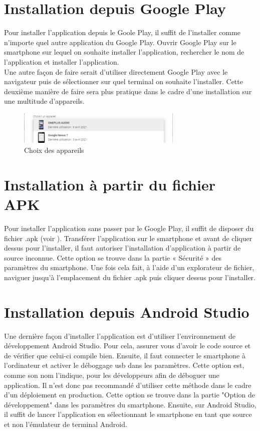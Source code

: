 \documentclass[UTF8]{EPURapport}
\begin{document}
\section{Installation depuis Google Play}
Pour installer l'application depuis le Goole Play, il suffit de l'installer comme n'importe quel autre application du Google Play. Ouvrir Google Play sur le smartphone sur lequel on souhaite installer l'application, rechercher le nom de l'application et installer l'application. \\
Une autre façon de faire serait d'utiliser directement Google Play avec le navigateur puis de sélectionner sur quel terminal on souhaite l'installer. Cette deuxième manière de faire sera plus pratique dans le cadre d'une installation sur une multitude d'appareils. \\
\begin{figure}[h!]
\centering
  \includegraphics[width=0.7\textwidth]{images/DeviceChoice.JPG}
  \caption{Choix des appareils}
  \label{fig:devicechoice}
\end{figure}
\section{Installation à partir du fichier APK}
Pour installer l'application sans passer par le Google Play, il suffit de disposer du fichier .apk (voir  ). Transférer l'application sur le smartphone et avant de cliquer dessus pour l'installer, il faut autoriser l'installation d'application à partir de source inconnue. Cette option se trouve dans la partie « Sécurité » des paramètres du smartphone. Une fois cela fait, à l'aide d'un explorateur de fichier, naviguer jusqu'à l'emplacement du fichier .apk puis cliquer dessus pour l'installer.

\section{Installation depuis Android Studio}
Une dernière façon d'installer l'application est d'utiliser l'environnement de développement Android Studio. Pour cela, assurer vous d'avoir le code source et de vérifier que celui-ci compile bien. Ensuite, il faut connecter le smartphone à l'ordinateur et activer le déboggage usb dans les paramètres. Cette option est, comme son nom l’indique, pour les développeurs afin de déboguer une application. Il n'est donc pas recommandé d'utiliser cette méthode dans le cadre d'un déploiement en production. Cette option se trouve dans la partie "Option de développement" dans les paramètres du smartphone. Ensuite, sur Android Studio, il suffit de lancer l'application en sélectionnant le smartphone en tant que source et non l'émulateur de terminal Android.
\end{document}
